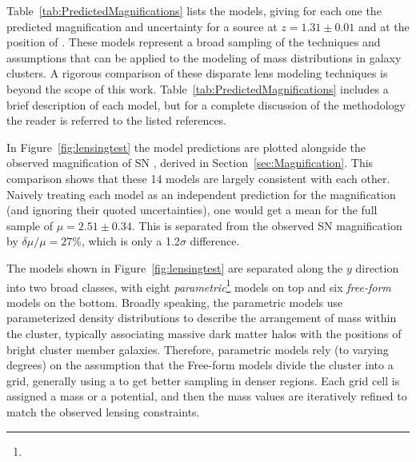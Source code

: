 Table~\ref{tab:PredictedMagnifications} lists the  models,
giving for each one the predicted magnification and uncertainty for a
source at $z=1.31\pm0.01$ and at the position of \tomas.  These models
represent a broad sampling of the techniques and assumptions that can
be applied to the modeling of mass distributions in galaxy clusters. A
rigorous comparison of these disparate lens modeling techniques is
beyond the scope of this work. Table~\ref{tab:PredictedMagnifications}
includes a brief description of each model, but for a complete
discussion of the methodology the reader is referred to the listed
references.

In Figure~\ref{fig:lensingtest} the model predictions are plotted
alongside the observed magnification of SN \tomas, derived in
Section~\ref{sec:Magnification}.  This comparison shows that these 14
models are largely consistent with each other. Naively treating each
model as an independent prediction for the magnification (and ignoring
their quoted uncertainties), one would get a mean for the full sample
of $\mu=2.51\pm0.34$.  This is separated from the observed SN
magnification by $\delta\mu/\mu=27\%$, which is only a 1.2$\sigma$
difference.

The models shown in Figure~\ref{fig:lensingtest} are separated along
the $y$ direction into two broad classes, with
eight  {\it parametric}\footnote{}
models on top and six {\it free-form} models on the bottom.  Broadly
speaking, the parametric models use parameterized density
distributions to describe the arrangement of mass within the cluster,
typically associating massive dark matter halos with the positions of
bright cluster member galaxies. Therefore, parametric models rely (to
varying degrees) on the assumption that the 
Free-form models divide the cluster into a grid, generally using a
 to get better sampling in denser regions. Each grid cell
is assigned a mass or a potential, and then the mass values are
iteratively refined to match the observed lensing
constraints. 

